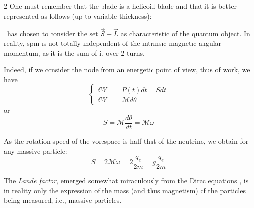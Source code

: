 \begin{multicols}{2}
	One must remember that the blade is a helicoid blade and that it is better represented as follows (up to variable thickness):
	\begin{center}
	\end{center}
	
	\MQ\ has chosen to consider the set $\vec{S}+\vec{L}$ as characteristic of the quantum object. In reality, spin is not totally independent of the intrinsic magnetic angular momentum, as it is the sum of it over 2 turns.
	
	Indeed, if we consider the node from an energetic point of view, thus of work, we have
	\begin{equation*}
		\left\{
		\begin{split}
			\delta W &= P(t) dt = S dt \\
			\delta W &= \mathcal{M} d\theta
		\end{split}
		\right.
	\end{equation*}
	or
	\begin{equation*}
		S = \mathcal{M} \frac{d\theta}{dt} = \mathcal{M} \omega
	\end{equation*}
	
	As the rotation speed of the vorespace is half that of the neutrino, we obtain for any massive particle:
	\begin{equation*}
		S = 2  \mathcal{M} \omega = 2 \frac{q_e}{2 m} = g \frac{q_e}{2 m}
	\end{equation*}
	
	The \textit{Lande factor}, emerged somewhat miraculously from the Dirac equations \cite{dirac1928quantum}, is in reality only the expression of the mass (and thus magnetism) of the particles being measured, i.e., massive particles.
	

\end{multicols}
